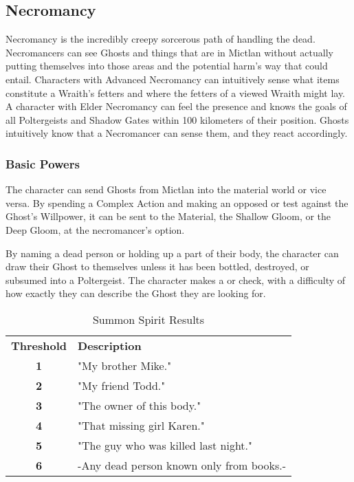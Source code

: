 \subsection{Necromancy}

Necromancy is the incredibly creepy sorcerous path of handling the dead. Necromancers can see Ghosts and things that are in Mictlan without actually putting themselves into those areas and the potential harm's way that could entail. Characters with Advanced Necromancy can intuitively sense what items constitute a Wraith's fetters and where the fetters of a viewed Wraith might lay. A character with Elder Necromancy can feel the presence and knows the goals of all Poltergeists and Shadow Gates within 100 kilometers of their position. Ghosts intuitively know that a Necromancer can sense them, and they react accordingly.

\subsubsection{Basic Powers}

 The character can send Ghosts from Mictlan into the material world or vice versa. By spending a Complex Action and making an opposed  or  test against the Ghost's Willpower, it can be sent to the Material, the Shallow Gloom, or the Deep Gloom, at the necromancer's option.

 By naming a dead person or holding up a part of their body, the character can draw their Ghost to themselves unless it has been bottled, destroyed, or subsumed into a Poltergeist. The character makes a  or  check, with a difficulty of how exactly they can describe the Ghost they are looking for.

\begin{table}[htb]
 \caption{Summon Spirit Results} \centering
\begin{tabular}{c l}
\textbf{Threshold} & \textbf{Description}\\
\textbf{1}& "My brother Mike."\\
\textbf{2}& "My friend Todd."\\
\textbf{3}& "The owner of this body."\\
\textbf{4}& "That missing girl Karen."\\
\textbf{5}& "The guy who was killed last night."\\
\textbf{6}& -Any dead person known only from books.-\\
\end{tabular}
\end{table}

